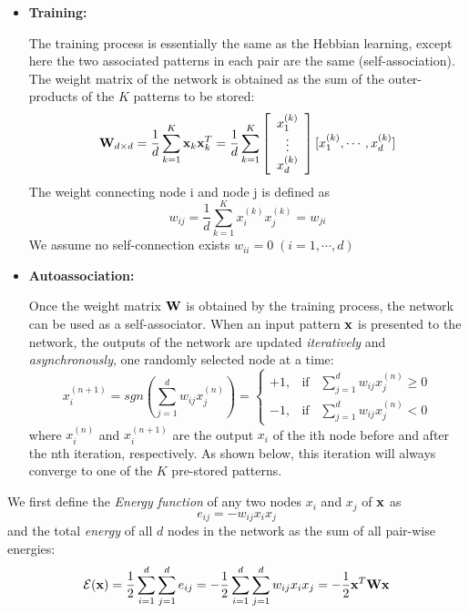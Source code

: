 \documentclass{article}
\begin{document}
\begin{itemize}
\item {\bf Training:}

  The training process is essentially the same as the Hebbian learning, 
  except here the two associated patterns in each pair are the same 
  (self-association). The weight matrix of the network is obtained as 
  the sum of the outer-products of the $K$ patterns to be stored:
  \begin{equation} 
    {\bf W}_{d\times d}=\frac{1}{d}\sum_{k=1}^K {\bf x}_k {\bf x}_k^T
    = \frac{1}{d}\sum_{k=1}^K 
    \left[ \begin{array}{c} x_1^{(k)} \\ \vdots \\ x_d^{(k)} \end{array} \right]
         [ x_1^{(k)}, \cdots, x_d^{(k)} ]	
  \end{equation}
  The weight connecting node i and node j is defined as
  \begin{equation}	
    w_{ij}=\frac{1}{d}\sum_{k=1}^K x_i^{(k)} x_j^{(k)}=w_{ji}	
  \end{equation}
  We assume no self-connection exists $w_{ii}=0\;(i=1,\cdots,d)$

\item {\bf Autoassociation:}

  Once the weight matrix ${\bf W}$ is obtained by the training process, 
  the network can be used as a self-associator. When an input pattern 
  ${\bf x}$ is presented to the network, the outputs of the network are
  updated {\em iteratively} and {\em asynchronously}, one randomly 
  selected node at a time:
  \begin{equation}
    x_i^{(n+1)}=sgn \left(\sum_{j=1}^d w_{ij}x_j^{(n)}\right)
    =\left\{ \begin{array}{ll} 
      +1, & \mbox{if}\;\;\;\sum_{j=1}^d w_{ij}x_j^{(n)} \geq 0 \\ 
      -1, & \mbox{if}\;\;\;\sum_{j=1}^d w_{ij}x_j^{(n)}  < 0 \end{array} \right.
  \end{equation}
  where $x_i^{(n)}$ and $x_i^{(n+1)}$ are the output $x_i$ of the ith node
  before and after the nth iteration, respectively. As shown below, this
  iteration will always converge to one of the $K$ pre-stored patterns.
\end{itemize}

We first define the {\em Energy function} of any two nodes $x_i$ and $x_j$ 
of ${\bf x}$ as
\begin{equation}
  e_{ij}=-w_{ij}x_ix_j	
\end{equation}
and the total {\em energy} of all $d$ nodes in the network as the sum 
of all pair-wise energies:
\begin{equation}
  {\cal E}({\bf x}) = \frac{1}{2}\sum_{i=1}^d\sum_{j=1}^d e_{ij}
  =-\frac{1}{2}\sum_{i=1}^d \sum_{j=1}^d w_{ij} x_i x_j 
  =-\frac{1}{2}{\bf x}^T{\bf Wx}
\end{equation}
\end{document}
